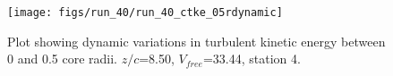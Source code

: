 \begin{figure}[H]
\centering
\texttt{[image: figs/run\_40/run\_40\_ctke\_05rdynamic]}
\caption{Plot showing dynamic variations in turbulent kinetic energy between 0 and 0.5 core radii. $z/c$=8.50, $V_{free}$=33.44, station 4.}
\label{fig:run_40_ctke_05rdynamic}
\end{figure}


